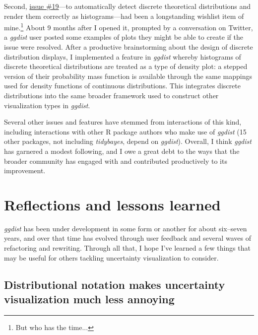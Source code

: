 \documentclass[journal]{vgtc}                     %
\begin{document}
Second, \href{https://github.com/mjskay/ggdist/issues/19}{issue \#19}---to automatically detect discrete theoretical distributions and render them correctly as histograms---had been a longstanding wishlist item of mine.\footnote{But who has the time...} About 9 months after I opened it, prompted by a conversation on Twitter, a \textit{ggdist} user posted some examples of plots they might be able to create if the issue were resolved. After a productive brainstorming about the design of discrete distribution displays, I implemented a feature in \textit{ggdist} whereby histograms of discrete theoretical distributions are treated as a type of density plot: a stepped version of their probability mass function is available through the same mappings used for density functions of continuous distributions. This integrates discrete distributions into the same broader framework used to construct other visualization types in \textit{ggdist}.

Several other issues and features have stemmed from interactions of this kind, including interactions with other R package authors who make use of \textit{ggdist}  (15 other packages, not including \textit{tidybayes}, depend on \textit{ggdist}). Overall, I think \textit{ggdist} has garnered a modest following, and I owe a great debt to the ways that the broader community has engaged with and contributed productively to its improvement.

\section{Reflections and lessons learned}

\textit{ggdist} has been under development in some form or another for about six--seven years, and over that time has evolved through user feedback and several waves of refactoring and rewriting. Through all that, I hope I've learned a few things that may be useful for others tackling uncertainty visualization to consider.

\subsection{Distributional notation makes uncertainty visualization much less annoying}

\end{document}
